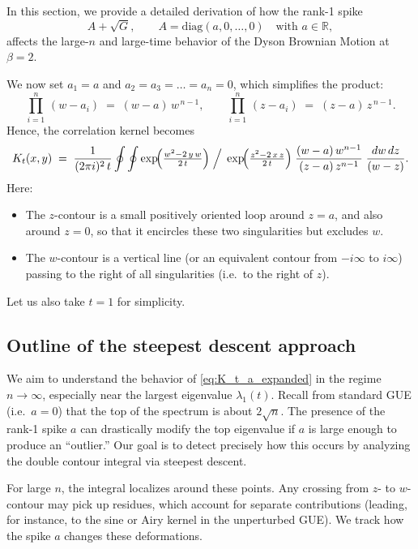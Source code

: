\documentclass[letterpaper,11pt,oneside,reqno]{article}
\numberwithin{equation}{section}
\theoremstyle{definition}
\begin{document}
\label{sec:rank1-spike-detailed}
In this section, we provide a detailed derivation of how the rank-1 spike 
\[
	A+\sqrt G,\qquad 
A = \mathrm{diag}(a,0,\dots,0)
\quad\text{with }a\in\mathbb{R},
\]
affects the large-$n$ and large-time behavior of the Dyson Brownian Motion at $\beta=2$.  

We now set $a_1=a$ and $a_2=a_3=\dots=a_n=0$, which simplifies the product:
\[
\prod_{i=1}^n\,(w - a_i)\;=\;(w-a)\,w^{\,n-1}, 
\qquad
\prod_{i=1}^n\,(z - a_i)\;=\;(z-a)\,z^{\,n-1}.
\]
Hence, the correlation kernel becomes
\begin{equation}
\label{eq:K_t_a_expanded}
K_t(x,y)
\;=\;
\frac{1}{(2\pi i)^2\,t}
\oint \oint
\exp\!\Bigl(\tfrac{w^2 - 2\,y\,w}{2\,t}\Bigr)\;\Big/\;\exp\!\Bigl(\tfrac{z^2 - 2\,x\,z}{2\,t}\Bigr)
\;\frac{(w-a)\,w^{n-1}}{(z-a)\,z^{n-1}}
\;\frac{dw\,dz}{(w - z)}.
\end{equation}
Here:
\begin{itemize}
\item The $z$-contour is a small positively oriented loop around $z=a$, and also around $z=0$, so that it encircles these two singularities but excludes $w$.  
\item The $w$-contour is a vertical line (or an equivalent contour from $-i\infty$ to $i\infty$) passing to the right of all singularities (i.e.\ to the right of $z$).  
\end{itemize}
Let us also take $t=1$ for simplicity.

\subsection{Outline of the steepest descent approach}

We aim to understand the behavior of 
\eqref{eq:K_t_a_expanded} in the regime $n\to\infty$, especially near the largest eigenvalue $\lambda_1(t)$.  Recall from standard GUE (i.e.\ $a=0$) that the top of the spectrum is about $2\sqrt{n}$.  The presence of the rank-1 spike $a$ can drastically modify the top eigenvalue if $a$ is large enough to produce an ``outlier.''  Our goal is to detect precisely how this occurs by analyzing the double contour integral via steepest descent.

For large $n$, the integral localizes around these points.  Any crossing from $z$- to $w$-contour may pick up residues, which account for separate contributions (leading, for instance, to the sine or Airy kernel in the unperturbed GUE).  We track how the spike $a$ changes these deformations.  
\end{document}
